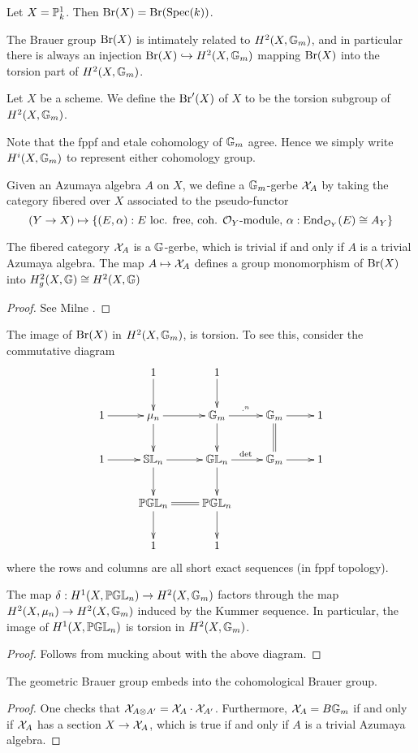 \begin{ex}
Let $X = \mathbb{P}^1_k$.  Then $\textnormal{Br}(X) = \textnormal{Br}(\textnormal{Spec}(k))$.
\end{ex}

The Brauer group $\textnormal{Br}(X)$ is intimately related to $H^2(X,\mathbb{G}_m)$, and in particular there is always an injection $\textnormal{Br}(X)\hookrightarrow H^2(X,\mathbb{G}_m)$ mapping $\textnormal{Br}(X)$ into the torsion part of $H^2(X,\mathbb{G}_m)$.
\begin{defn}
Let $X$ be a scheme.  We define the  $\textnormal{Br}'(X)$ of $X$ to be the torsion subgroup of $H^2(X,\mathbb{G}_m)$.
\end{defn}

\begin{remk}
Note that the fppf and etale cohomology of $\mathbb{G}_m$ agree.  Hence we simply write $H^i(X,\mathbb{G}_m)$ to represent either cohomology group.
\end{remk}

Given an Azumaya algebra $A$ on $X$, we define a $\mathbb{G}_m$-gerbe $\mathcal{X}_A$ by taking the category fibered over $X$ associated to the pseudo-functor
$$(Y\rightarrow X)\mapsto \{(E,\alpha):\text{$E$ loc. free, coh. $\mathcal{O}_Y$-module, $\alpha: \textnormal{End}_{\mathcal{O}_Y}(E)\cong A_Y$}\}$$
\begin{lem}
The fibered category $\mathcal{X}_A$ is a $\mathbb{G}$-gerbe, which is trivial if and only if $A$ is a trivial Azumaya algebra.  The map $A\mapsto \mathcal{X}_A$ defines a group monomorphism of $\textnormal{Br}(X)$ into $H^2_g(X,\mathbb{G})\cong H^2(X,\mathbb{G})$
\end{lem}
\begin{proof}
See Milne \cite{milne1980etale}.
\end{proof}

The image of $\textnormal{Br}(X)$ in $H^2(X,\mathbb{G}_m)$, is torsion.  To see this, consider the commutative diagram
$$\xymatrix{
& 1\ar[d] & 1\ar[d]\\
1\ar[r] & \mu_n\ar[d]\ar[r] & \bbg_m\ar[d]\ar[r]^{\cdot^n} & \bbg_m\ar@{=}[d]\ar[r] & 1\\
1\ar[r] & \bbsl_n\ar[d]\ar[r] & \bbgl_n\ar[d]\ar[r]^{\det} & \bbg_m\ar[r] & 1\\
& \bbpgl_n\ar[d] \ar@{=}[r]& \bbpgl_n\ar[d]\\
& 1 & 1
}$$
where the rows and columns are all short exact sequences (in fppf topology).
\begin{prop}
The map $\delta: H^1(X,\mathbb{PGL}_n)\rightarrow H^2(X,\mathbb{G}_m)$ factors through the map $H^2(X,\mu_n)\rightarrow H^2(X,\mathbb{G}_m)$ induced by the Kummer sequence.  In particular, the image of $H^1(X,\mathbb{PGL}_n)$ is torsion in $H^2(X,\mathbb{G}_m)$.
\end{prop}
\begin{proof}
Follows from mucking about with the above diagram.
\end{proof}
\begin{cor}
The geometric Brauer group embeds into the cohomological Brauer group.
\end{cor}
\begin{proof}
One checks that $\mathcal{X}_{A\otimes A'} = \mathcal{X}_{A}\cdot\mathcal{X}_{A'}$.  Furthermore, $\mathcal{X}_A = B\mathbb{G}_m$ if and only if $\mathcal{X}_A$ has a section $X\rightarrow\mathcal{X}_A$, which is true if and only if $A$ is a trivial Azumaya algebra.
\end{proof}

